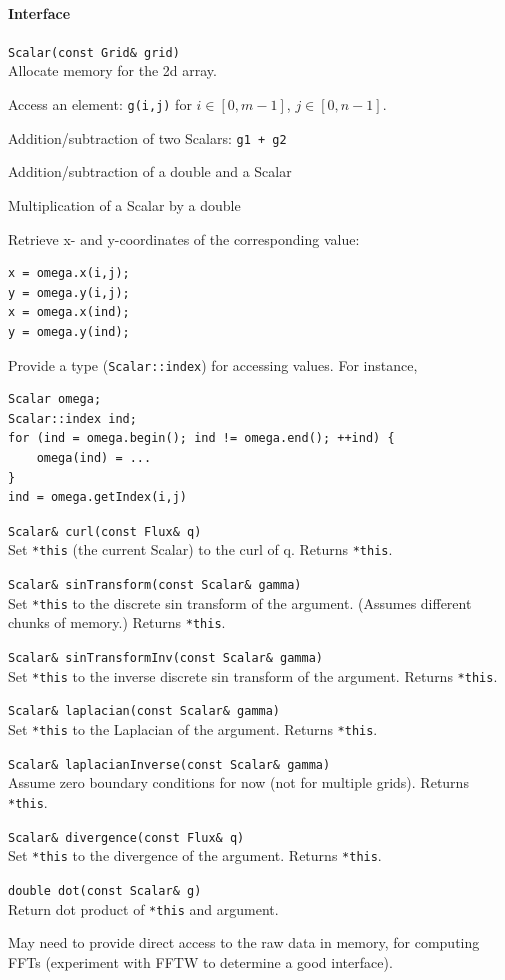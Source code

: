 \documentclass[11pt]{article}
\let\code\lstinline
\begin{document}
\paragraph{Interface}
\begin{description}
	\item \code|Scalar(const Grid& grid)|\\
	Allocate memory for the 2d array.
	\item Access an element: \code|g(i,j)| for $i\in[0,m-1]$, $j\in[0,n-1]$.
	\item Addition/subtraction of two Scalars: \code|g1 + g2|
	\item Addition/subtraction of a double and a Scalar
	\item Multiplication of a Scalar by a double
	\item Retrieve x- and y-coordinates of the corresponding value:
	\begin{lstlisting}
x = omega.x(i,j);
y = omega.y(i,j);
x = omega.x(ind);
y = omega.y(ind);
	\end{lstlisting}
	\item Provide a type (\code|Scalar::index|) for accessing values.  For instance,
	\begin{lstlisting}
Scalar omega;
Scalar::index ind;
for (ind = omega.begin(); ind != omega.end(); ++ind) {
	omega(ind) = ...
}
ind = omega.getIndex(i,j)
	\end{lstlisting}
	\item \code|Scalar& curl(const Flux& q)|\\
	Set \code|*this| (the current Scalar) to the curl of q.  Returns \code|*this|.
	\item \code|Scalar& sinTransform(const Scalar& gamma)|\\
	Set \code|*this| to the discrete sin transform of the argument.  (Assumes different chunks of memory.)   Returns \code|*this|.
	\item \code|Scalar& sinTransformInv(const Scalar& gamma)|\\
	Set \code|*this| to the inverse discrete sin transform of the argument.   Returns \code|*this|.
	\item \code|Scalar& laplacian(const Scalar& gamma)|\\
	Set \code|*this| to the Laplacian of the argument.   Returns \code|*this|.
	\item \code|Scalar& laplacianInverse(const Scalar& gamma)|\\
	Assume zero boundary conditions for now (not for multiple grids).   Returns \code|*this|.
	\item \code|Scalar& divergence(const Flux& q)|\\
	Set \code|*this| to the divergence of the argument.   Returns \code|*this|.
	\item \code|double dot(const Scalar& g)|\\
	Return dot product of \code|*this| and argument.
	\item May need to provide direct access to the raw data in memory, for computing FFTs (experiment with FFTW to determine a good interface).
\end{description}
\end{document}
